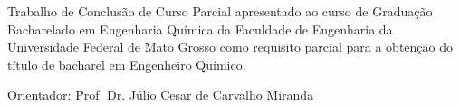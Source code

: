 \startalignment[middle]
	\startplacefigure[location=none]
	\stopplacefigure


	\vfill


	\vfill

\stopalignment

\page[yes]

\startalignment[middle]

	\vfill

\stopalignment

	\blank[2*big]

\startnarrower[15*left]
	\noindent Trabalho de Conclusão de Curso Parcial apresentado ao curso de Graduação Bacharelado em Engenharia Química da Faculdade de Engenharia da Universidade Federal de Mato Grosso como requisito parcial para a obtenção do título de bacharel em Engenheiro Químico.

	\noindent Orientador: Prof. Dr. Júlio Cesar de Carvalho Miranda
\stopnarrower

\vfill

\page[yes]

\startsubject[title={Lista de Ilustrações}]
	\placelist[figure][criterium=all, alternative=c]
\stopsubject

\page[yes]

\startsubject[title={Lista de Tabelas}]
	\placelist[table][criterium=all, alternative=c]
\stopsubject

\page[yes]

\startsubject[title={Sumário}]
	\placecontent[criterium=all, alternative=c]
\stopsubject
